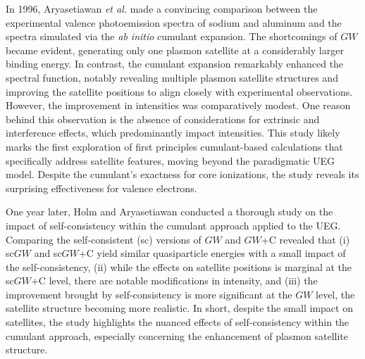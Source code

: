 \documentclass[aip,jcp,reprint,noshowkeys,superscriptaddress]{revtex4-2}
\begin{document}
In 1996, Aryasetiawan \textit{et al.} \cite{Aryasetiawan_1996} made a convincing comparison between the experimental valence photoemission spectra of sodium and aluminum and the spectra simulated via the \textit{ab initio} cumulant expansion. The shortcomings of $GW$ became evident, generating only one plasmon satellite at a considerably larger binding energy. In contrast, the cumulant expansion remarkably enhanced the spectral function, notably revealing multiple plasmon satellite structures and improving the satellite positions to align closely with experimental observations. However, the improvement in intensities was comparatively modest. One reason behind this observation is the absence of considerations for extrinsic and interference effects, which predominantly impact intensities.  
This study likely marks the first exploration of first principles cumulant-based calculations that specifically address satellite features, moving beyond the paradigmatic UEG model. Despite the cumulant's exactness for core ionizations, \cite{Langreth_1970,Almbladh_1983} the study reveals its surprising effectiveness for valence electrons.

One year later, Holm and Aryasetiawan conducted a thorough study on the impact of self-consistency within the cumulant approach applied to the UEG. \cite{Holm_1997} Comparing the self-consistent (sc) versions of $GW$ and $GW$+C revealed that (i) sc$GW$ and sc$GW$+C yield similar quasiparticle energies with a small impact of the self-consistency, (ii) while the effects on satellite positions is marginal at the sc$GW$+C level, there are notable modifications in intensity, and (iii) the improvement brought by self-consistency is more significant at the $GW$ level, the satellite structure becoming more realistic. In short, despite the small impact on satellites, the study highlights the nuanced effects of self-consistency within the cumulant approach, especially concerning the enhancement of plasmon satellite structure.
\end{document}
